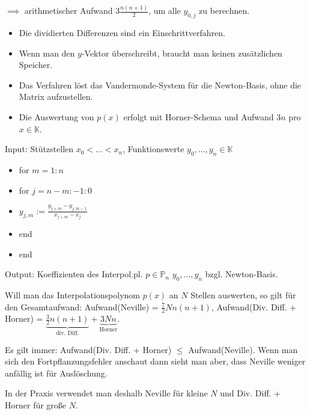 $\implies$ arithmetischer Aufwand $3 \frac{n(n+1)}{2}$, um alle $y_{0,j}$ zu berechnen.

\begin{remark}
	\begin{itemize}
		\item Die dividierten Differenzen sind ein Einschrittverfahren.
		\item Wenn man den $y$-Vektor überschreibt, braucht man keinen zusätzlichen Speicher.
		\item Das Verfahren löst das Vandermonde-System für die Newton-Basis, ohne die Matrix aufzustellen.
		\item Die Auswertung von $p(x)$ erfolgt mit Horner-Schema und Aufwand $3n$ pro $x \in \mathbb{K}$.
	\end{itemize}
\end{remark}

\begin{algorithm}
	Input: Stützstellen $x_0 < ... < x_n$, Funktionswerte $y_0, ..., y_n \in \mathbb{K}$
	
	\begin{itemize}
		\item for $m=1:n$
		\item \hspace{0.5cm} for $j = n-m:-1:0$
		\item \hspace{1cm} $y_{j,m} := \frac{y_{j+m} - y_{j,m-1}}{x_{j+m} - x_j}$
		\item \hspace{0.5cm} end
		\item end
	\end{itemize}
	
	Output: Koeffizienten des Interpol.pl. $p \in \mathbb{P}_n$ $y_0, ..., y_n$ bzgl. Newton-Basis.
\end{algorithm}

\begin{remark}
	Will man das Interpolationspolynom $p(x)$ an $N$ Stellen auswerten, so gilt für den Gesamtaufwand: Aufwand(Neville) = $\frac{7}{2}Nn(n+1)$, Aufwand(Div. Diff. + Horner) = $\underbrace{\frac{3}{2}n(n+1)}_{\text{div. Diff.}} + \underbrace{3Nn}_{\text{Horner}}$.
	
	Es gilt immer: Aufwand(Div. Diff. + Horner) $\leq$ Aufwand(Neville). Wenn man sich den Fortpflanzungsfehler anschaut dann sieht man aber, dass Neville weniger anfällig ist für Auslöschung.
	
	In der Praxis verwendet man deshalb Neville für kleine $N$ und Div. Diff. + Horner für große $N$.
\end{remark}

